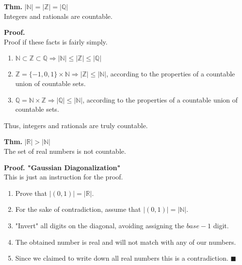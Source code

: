 \documentclass{article}
\newenvironment{theorem}[2][Thm.]
    { \begin{mdframed}[backgroundcolor=blue!10] \textbf{#1} {#2} \vspace{0.2cm}\\}
    {  \end{mdframed}}
\newenvironment{prf}[2][Proof.]
    { \begin{mdframed}[] \textbf{#1 #2} \\}
    {  \end{mdframed}}
\newcommand{\N}{\mathbb{N}}
\newcommand{\Z}{\mathbb{Z}}
\newcommand{\Q}{\mathbb{Q}}
\newcommand{\R}{\mathbb{R}}
\newcommand{\ep}{\hfill $\blacksquare$\nl}
\begin{document}
    \begin{theorem}{$|\N| = |\Z| = |\Q|$}
        Integers and rationals are countable.
    \end{theorem}
    \begin{prf}{}
        Proof if these facts is fairly simply.
        \begin{enumerate}
            \item $\N \subset \Z \subset \Q \Rightarrow |\N| \le |\Z| \le |\Q|$
            \item $\Z = \{-1, 0, 1\} \times \N \Rightarrow |\Z| \le |\N|$, according to the properties of a countable union of countable sets.
            \item $\Q = \N \times \Z \Rightarrow |\Q| \le |\N|$, according to the properties of a countable union of countable sets.
        \end{enumerate}
        Thus, integers and rationals are truly countable.
    \end{prf}
    
    \begin{theorem}{$|\R| > |\N|$}
        The set of real numbers is not countable.
    \end{theorem}
    
    \begin{prf}{"Gaussian Diagonalization"}
    This is just an instruction for the proof.
        \begin{enumerate}
            \item Prove that $|(0, 1)| = |\R|$.
            \item For the sake of contradiction, assume that $|(0, 1)| = |\N|$.
            \item "Invert" all digits on the diagonal, avoiding assigning the $base-1$ digit.
            \item The obtained number is real and will not match with any of our numbers. 
            \item Since we claimed to write down all real numbers this is a contradiction. 
            \ep
        \end{enumerate}
    \end{prf}
\end{document}
